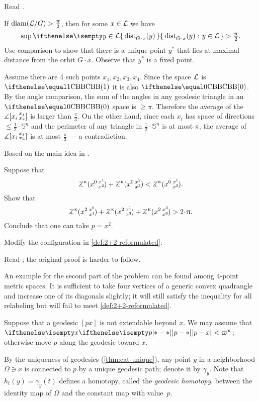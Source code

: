 Read \cite{petrunin:globalization}.

 If $\mathop{\rm diam}\nolimits(\mathcal{L}/G)>\tfrac{\uppi}2$, then for some $x\in \spc{L}$ we have
\[\sup \set{\distfun{G\cdot x}(y)}{y\in \spc{L}}
>
\tfrac\pi2.\]
Use comparison to show that there is a unique point $y^{*}$ that lies at maximal distance from the orbit $G\cdot x$.
Observe that $y^{*}$ is a fixed point.

Assume there are 4 such points $x_1,x_2,x_3,x_4$.
Since the space $\mathcal{L}$ is $\Alex{1}$ it is also $\Alex{0}$.
By the angle comparison, the sum of the angles in any geodesic triangle in an $\Alex{0}$ space is $\ge \pi$.
Therefore the average of the $\measuredangle[x_i\,{}^{x_j}_{x_k}]$ is  larger than $\tfrac\pi3$.
On the other hand, since each $x_i$ has space of directions $\le\tfrac12\cdot\mathbb{S}^n$ and the perimeter of any triangle in $\tfrac12\cdot\mathbb{S}^n$ is at most $\pi$, the average of $\measuredangle[x_i\,{}^{x_j}_{x_k}]$ is at most $\tfrac\pi3$ --- a contradiction.

 Based on the main idea in \cite{hsiang-kleiner}.

Suppose that 
\[\angk\kappa {x^0}{x^1}{x^2}+\angk\kappa {x^0}{x^2}{x^3}<\angk\kappa {x^0}{x^1}{x^3}.\]
Show that
\[\angk\kappa {x^2}{x^0}{x^1}+\angk\kappa {x^2}{x^1}{x^3}+\angk\kappa {x^2}{x^3}{x^0}>2\cdot\pi.\]
Conclude that one can take $p=x^2$.

Modify the configuration in \ref{def:2+2-reformulated}.

Read \cite{sato};
the original proof \cite{berg-nikolaev} is harder to follow.

An example for the second part of the problem can be found among 4-point metric spaces.
It is sufficient to take four vertices of a generic convex quadrangle and increase one of its diagonals slightly;
it will still satisfy the inequality for all relabeling but will fail to meet \ref{def:2+2-reformulated}.

Suppose that a geodesic $[px]$ is not extendable beyond $x$.
We may assume that $\dist{p}{x}{}<\varpi\kappa$;
otherwise move $p$ along the geodesic toward  $x$.

By the uniqueness of geodesics (\ref{thm:cat-unique}), any point $y$ in a neighborhood $\Omega\ni x$ is connected to $p$ by a unique geodesic path; denote it by $\gamma_y$.
Note that $h_t(y)=\gamma_y(t)$ defines a homotopy, called the  \emph{geodesic homotopy}, between the identity map of $\Omega$ and the constant map with value~$p$.

